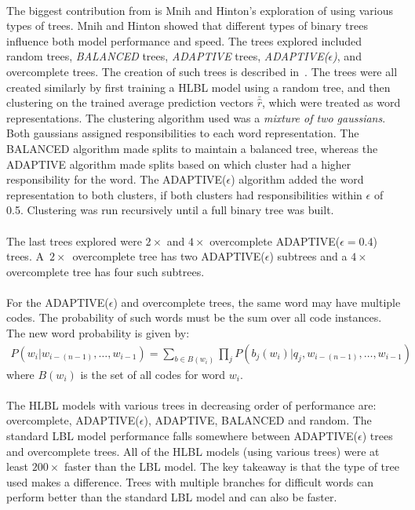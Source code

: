 \paragraph{}
The biggest contribution from \cite{MnihHinton2009} is  Mnih and Hinton's exploration of using various types of trees. Mnih and Hinton showed that different types of binary trees influence both model performance and speed. The trees explored included random trees, \emph{BALANCED} trees, \emph{ADAPTIVE} trees, \emph{ADAPTIVE($\epsilon$)}, and overcomplete trees. The creation of such trees is described in~\cite{MnihHinton2009}.
The trees were all created similarly by first training a HLBL model using a random tree, and then clustering on the trained average prediction vectors $\bar{\hat{r}}$, which were treated as word representations. The clustering algorithm used was a \emph{mixture of two gaussians}. Both gaussians assigned responsibilities to each word representation. The BALANCED algorithm made splits to maintain a balanced tree, whereas the ADAPTIVE algorithm made splits based on which cluster had a higher responsibility for the word. The ADAPTIVE($\epsilon$) algorithm added the word representation to both clusters, if both clusters had responsibilities within $\epsilon$ of 0.5. Clustering was run recursively until a full binary tree was built. 

\paragraph{}
The last trees explored were $2\times$ and $4\times$ overcomplete ADAPTIVE($\epsilon=0.4$) trees. A~$2\times$~overcomplete tree has two ADAPTIVE($\epsilon$) subtrees and a $4\times$ overcomplete tree has four such subtrees. 

\paragraph{}
For the ADAPTIVE($\epsilon$) and overcomplete trees, the same word may have multiple codes. The probability of such words must be the sum over all code instances. The new word probability is given by:
\begin{align}
P(w_i | w_{i-(n-1)},\dots, w_{i-1}) = \sum_{b \in B(w_i)} \prod_j P(b_j(w_i) | q_j, w_{i-(n-1)},\dots, w_{i-1})
\end{align}
where $B(w_i)$ is the set of all codes for word $w_i$.

\paragraph{}
The HLBL models with various trees in decreasing order of performance are: overcomplete, ADAPTIVE($\epsilon$), ADAPTIVE, BALANCED and random. The standard LBL model performance falls somewhere between ADAPTIVE($\epsilon$) trees and overcomplete trees. All of the HLBL models (using various trees) were at least $200\times$ faster than the LBL model. 
The key takeaway is that the type of tree used makes a difference. Trees with multiple branches for difficult words can perform better than the standard LBL model and can also be faster.

